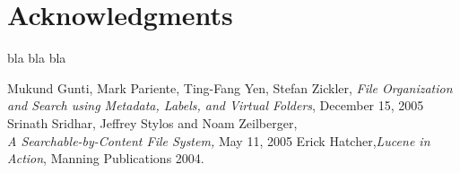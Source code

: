 \documentclass[10pt,twocolumn]{article}
\begin{document}
\section*{Acknowledgments}
bla bla bla
\begin{thebibliography}{9}
\small  %


Mukund Gunti, Mark Pariente, Ting-Fang Yen, Stefan Zickler,
{\em File Organization and Search using Metadata, Labels, and Virtual Folders},
December 15, 2005
Srinath Sridhar, Jeffrey Stylos and Noam Zeilberger,\\
{\em A Searchable-by-Content File System,} May 11, 2005
Erick Hatcher,{\em Lucene in Action}, Manning Publications 2004.

\end{thebibliography}
\end{document}

